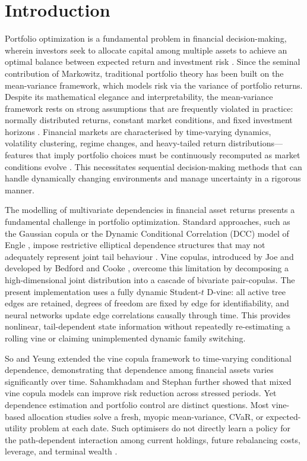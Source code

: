 \section{Introduction}
\label{sec:introduction}

Portfolio optimization is a fundamental problem in financial decision-making, wherein investors seek to allocate capital among multiple assets to achieve an optimal balance between expected return and investment risk \cite{markowitz_portfolio_1952}. Since the seminal contribution of Markowitz, traditional portfolio theory has been built on the mean-variance framework, which models risk via the variance of portfolio returns. Despite its mathematical elegance and interpretability, the mean-variance framework rests on strong assumptions that are frequently violated in practice: normally distributed returns, constant market conditions, and fixed investment horizons \cite{campbell_econometrics_1998,demiguel_optimal_2009}. Financial markets are characterised by time-varying dynamics, volatility clustering, regime changes, and heavy-tailed return distributions---features that imply portfolio choices must be continuously recomputed as market conditions evolve \cite{campbell_econometrics_1998}. This necessitates sequential decision-making methods that can handle dynamically changing environments and manage uncertainty in a rigorous manner.

The modelling of multivariate dependencies in financial asset returns presents a fundamental challenge in portfolio optimization. Standard approaches, such as the Gaussian copula or the Dynamic Conditional Correlation (DCC) model of Engle \cite{engle_dynamic_2002}, impose restrictive elliptical dependence structures that may not adequately represent joint tail behaviour \cite{jondeau_copula-garch_2006,rodriguez_measuring_2007}. Vine copulas, introduced by Joe \cite{joe_multivariate_1997} and developed by Bedford and Cooke \cite{bedford_probability_2001,bedford_vinesnew_2002}, overcome this limitation by decomposing a high-dimensional joint distribution into a cascade of bivariate pair-copulas. The present implementation uses a fully dynamic Student-$t$ D-vine: all active tree edges are retained, degrees of freedom are fixed by edge for identifiability, and neural networks update edge correlations causally through time. This provides nonlinear, tail-dependent state information without repeatedly re-estimating a rolling vine or claiming unimplemented dynamic family switching.

So and Yeung \cite{so_vine-copula_2014} extended the vine copula framework to time-varying conditional dependence, demonstrating that dependence among financial assets varies significantly over time. Sahamkhadam and Stephan \cite{sahamkhadam_portfolio_2023} further showed that mixed vine copula models can improve risk reduction across stressed periods. Yet dependence estimation and portfolio control are distinct questions. Most vine-based allocation studies solve a fresh, myopic mean-variance, CVaR, or expected-utility problem at each date. Such optimisers do not directly learn a policy for the path-dependent interaction among current holdings, future rebalancing costs, leverage, and terminal wealth \cite{bernardi_portfolio_2018}.

